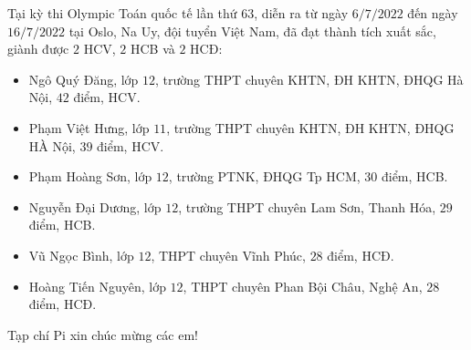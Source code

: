\begin{tBox}
	Tại kỳ thi Olympic Toán quốc tế lần thứ $63$, diễn ra từ ngày $6/7/2022$ đến ngày $16/7/2022$ tại Oslo, Na Uy, đội tuyển Việt Nam, đã đạt thành tích xuất sắc, giành được $2$ HCV, $2$ HCB và $2$ HCĐ:
	\begin{itemize}[leftmargin = 10pt, itemsep =0.5pt, parsep =0.5pt, topsep =0.5pt]
		\item Ngô Quý Đăng, lớp $12$, trường THPT chuyên KHTN, ĐH KHTN, ĐHQG Hà Nội, $42$ điểm, HCV.
		\item Phạm Việt Hưng, lớp $11$, trường THPT chuyên KHTN, ĐH KHTN, ĐHQG HÀ Nội, $39$ điểm, HCV.
		\item Phạm Hoàng Sơn, lớp $12$, trường PTNK, ĐHQG Tp HCM, $30$ điểm, HCB.
		\item Nguyễn Đại Dương, lớp $12$, trường THPT chuyên Lam Sơn, Thanh Hóa, $29$ điểm, HCB.
		\item Vũ Ngọc Bình, lớp $12$, THPT chuyên Vĩnh Phúc, $28$ điểm, HCĐ.
		\item Hoàng Tiến Nguyên, lớp $12$, THPT chuyên Phan Bội Châu, Nghệ An, $28$ điểm, HCĐ.
	\end{itemize}
	Tạp chí Pi xin chúc mừng các em!
\end{tBox}

